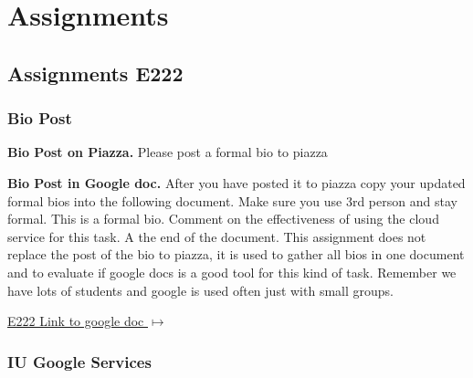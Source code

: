 

\chapter{Assignments}\label{c:222-assignments}

\section{Assignments E222}
\label{s:e222-assignment}
\label{s:e222-assignments}

\subsection{Bio Post}
\label{E:e222-bio}

\begin{exercise}\label{E:e222-bio-piazza}
{\bf Bio Post on Piazza.} Please post a formal bio to piazza
\end{exercise}

\begin{exercise} \label{E:e222-bio-googledocs}

  {\bf Bio Post in Google doc.} After you have posted it to piazza
  copy your updated formal bios into the following document.  Make
  sure you use 3rd person and stay formal. This is a formal
  bio. Comment on the effectiveness of using the cloud service for
  this task. A the end of the document. This assignment does not
  replace the post of the bio to piazza, it is used to gather all bios
  in one document and to evaluate if google docs is a good tool for
  this kind of task. Remember we have lots of students and google is
  used often just with small groups.
 
 \smallskip

 {\hfill \href{https://docs.google.com/document/d/1ejzlKYqC3dLac8WXVpcPQsJh1j4BDqRxxgGg1cFQbeQ/edit?usp=sharing}{E222 Link to google doc $\mapsto$}}

 \end{exercise}

\subsection{IU Google Services}
\label{E:e222-iu-google-services}

